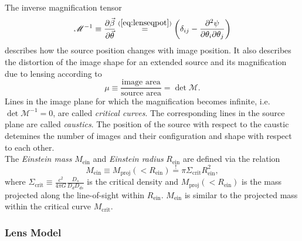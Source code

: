 \documentclass[useAMS,usenatbib]{mn2e}
\begin{document}
\\The inverse magnification tensor
\begin{equation}
\mathscr{M}^{-1} \equiv \frac{\partial \vec{\beta}}{\partial \vec{\theta}} \overset{(\ref{eq:lenseqpot})}{=} \left(\delta_{ij} - \frac{\partial^2 \psi}{\partial \theta_i \partial \theta_j} \right)\label{eq:magnificationtensor}
\end{equation}
describes how the source position changes with image position. It also describes the distortion of the image shape for an extended source and its magnification due to lensing according to
$$\mu \equiv \frac{\text{image area}}{\text{source area}} = \det \mathscr{M}.$$
Lines in the image plane for which the magnification becomes infinite, i.e. $\det \mathscr{M}^{-1} = 0$, are called \emph{critical curves}. The corresponding lines in the source plane are called \emph{caustics}. The position of the source with respect to the caustic detemines the number of images and their configuration and shape with respect to each other.
\\The \emph{Einstein mass} $M_\text{ein}$ and \emph{Einstein radius} $R_\text{ein}$ are defined via the relation
\begin{equation*}
M_\text{ein} \equiv M_\text{proj}(<R_\text{ein}) \overset{!}{=} \pi \Sigma_\text{crit} R_\text{ein}^2,
\end{equation*}
where $\Sigma_\text{crit} \equiv \frac{c^2}{4\pi G} \frac{D_s}{D_d D_{ds}}$ is the critical density and $M_\text{proj}(<R_\text{ein})$ is the mass projected along the line-of-sight within $R_\text{ein}$. $M_\text{ein}$ is similar to the projected mass within the critical curve $M_\text{crit}$.

\subsubsection{Lens Model} %
\end{document}

